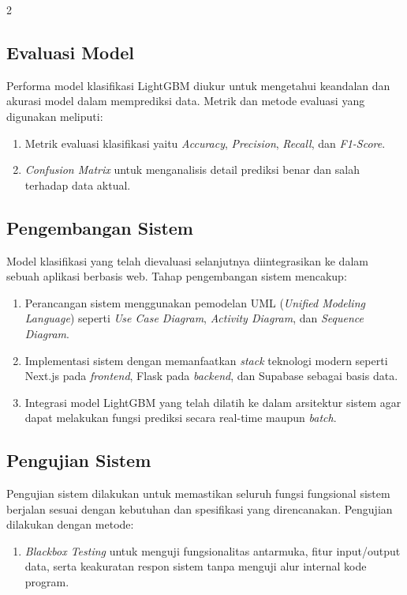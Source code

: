 \documentclass[12pt, a4paper, onecolumn, oneside]{report}
\begin{document}
\begin{spacing}{2}
\subsection{Evaluasi Model}
Performa model klasifikasi LightGBM diukur untuk mengetahui keandalan dan akurasi model dalam memprediksi data. Metrik dan metode evaluasi yang digunakan meliputi:
\begin{enumerate}
    \item Metrik evaluasi klasifikasi yaitu \textit{Accuracy}, \textit{Precision}, \textit{Recall}, dan \textit{F1-Score}.
    \item \textit{Confusion Matrix} untuk menganalisis detail prediksi benar dan salah terhadap data aktual.
\end{enumerate}

\subsection{Pengembangan Sistem}
Model klasifikasi yang telah dievaluasi selanjutnya diintegrasikan ke dalam sebuah aplikasi berbasis web. Tahap pengembangan sistem mencakup:
\begin{enumerate}
    \item Perancangan sistem menggunakan pemodelan UML (\textit{Unified Modeling Language}) seperti \textit{Use Case Diagram}, \textit{Activity Diagram}, dan \textit{Sequence Diagram}.
    \item Implementasi sistem dengan memanfaatkan \textit{stack} teknologi modern seperti Next.js pada \textit{frontend}, Flask pada \textit{backend}, dan Supabase sebagai basis data.
    \item Integrasi model LightGBM yang telah dilatih ke dalam arsitektur sistem agar dapat melakukan fungsi prediksi secara real-time maupun \textit{batch}.
\end{enumerate}

\subsection{Pengujian Sistem}
Pengujian sistem dilakukan untuk memastikan seluruh fungsi fungsional sistem berjalan sesuai dengan kebutuhan dan spesifikasi yang direncanakan. Pengujian dilakukan dengan metode:
\begin{enumerate}
    \item \textit{Blackbox Testing} untuk menguji fungsionalitas antarmuka, fitur input/output data, serta keakuratan respon sistem tanpa menguji alur internal kode program.
\end{enumerate}


\end{spacing}
\end{document}
